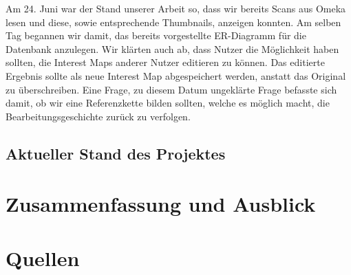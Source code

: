 \documentclass{article}
\begin{document}
Am 24. Juni war der Stand unserer Arbeit so, dass wir bereits Scans aus Omeka lesen und diese, sowie entsprechende Thumbnails, anzeigen konnten. Am selben Tag begannen wir damit, das bereits vorgestellte ER-Diagramm für die Datenbank anzulegen. Wir klärten auch ab, dass Nutzer die Möglichkeit haben sollten, die Interest Maps anderer Nutzer editieren zu können. Das editierte Ergebnis sollte als neue Interest Map abgespeichert werden, anstatt das Original zu überschreiben. Eine Frage, zu diesem Datum ungeklärte Frage befasste sich damit, ob wir eine Referenzkette bilden sollten, welche es möglich macht, die Bearbeitungsgeschichte zurück zu verfolgen. \\


\subsection{Aktueller Stand des Projektes}

\section{Zusammenfassung und Ausblick}

\section*{Quellen}
  \printbibliography[%
    heading=bibintoc, %
  ]
\end{document}
